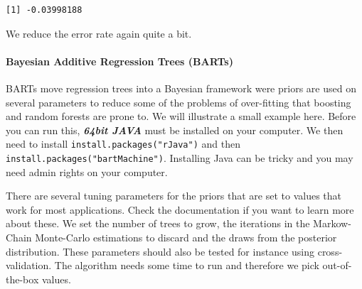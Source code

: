 \documentclass[]{article}
\let\oldparagraph\paragraph
\renewcommand{\paragraph}[1]{\oldparagraph{#1}\mbox{}}
\begin{document}
\begin{verbatim}
[1] -0.03998188
\end{verbatim}

We reduce the error rate again quite a bit.

\hypertarget{bayesian-additive-regression-trees-barts}{%
\paragraph{Bayesian Additive Regression Trees (BARTs)}\label{bayesian-additive-regression-trees-barts}}

BARTs move regression trees into a Bayesian framework were priors are used on several parameters to reduce some of the problems of over-fitting that boosting and random forests are prone to. We will illustrate a small example here. Before you can run this, \textbf{\emph{64bit JAVA}} must be installed on your computer. We then need to install \texttt{install.packages("rJava")} and then \texttt{install.packages("bartMachine")}. Installing Java can be tricky and you may need admin rights on your computer.

There are several tuning parameters for the priors that are set to values that work for most applications. Check the documentation if you want to learn more about these. We set the number of trees to grow, the iterations in the Markow-Chain Monte-Carlo estimations to discard and the draws from the posterior distribution. These parameters should also be tested for instance using cross-validation. The algorithm needs some time to run and therefore we pick out-of-the-box values.
\end{document}
